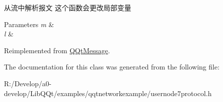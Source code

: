 从流中解析报文 这个函数会更改局部变量 


\begin{DoxyParams}{Parameters}
{\em m} & \\
\hline
{\em l} & \\
\hline
\end{DoxyParams}


Reimplemented from \mbox{\hyperlink{class_q_qt_message_a0bc25669bdd61490b1d8df6d77565f31}{Q\+Qt\+Message}}.



The documentation for this class was generated from the following file\+:\begin{DoxyCompactItemize}
\item 
R\+:/\+Develop/a0-\/develop/\+Lib\+Q\+Qt/examples/qqtnetworkexample/usernode7protocol.\+h\end{DoxyCompactItemize}
